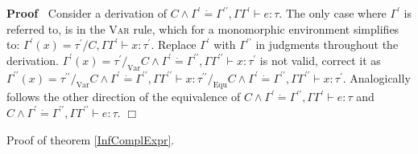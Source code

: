 \documentclass{article}
\newcommand{\tmname}[1]{\textsc{#1}}
\newcommand{\tmop}[1]{\ensuremath{\operatorname{#1}}}
\newenvironment{proof}{\noindent\textbf{Proof\ }}{\hspace*{\fill}$\Box$\medskip}
\begin{document}
\begin{proof}
  Consider a derivation of $C \wedge \Gamma^{\prime} \dot{=}
  \Gamma^{\prime\prime}, \Gamma \Gamma^{\prime} \vdash e : \tau$. The only
  case where $\Gamma^{\prime}$ is referred to, is in the {\tmname{Var}} rule,
  which for a monomorphic environment simplifies to: $\Gamma^{\prime} (x) =
  \tau^{\prime} / C, \Gamma \Gamma^{\prime} \vdash x : \tau^{\prime}$. Replace
  $\Gamma^{\prime}$ with $\Gamma^{\prime\prime}$ in judgments throughout the
  derivation. $\Gamma^{\prime} (x) = \tau^{\prime} /_{\tmop{Var}} C \wedge
  \Gamma^{\prime} \dot{=} \Gamma^{\prime\prime}, \Gamma \Gamma^{\prime\prime}
  \vdash x : \tau^{\prime}$ is not valid, correct it as $\Gamma^{\prime\prime}
  (x) = \tau^{\prime\prime} /_{\tmop{Var}} C \wedge \Gamma^{\prime} \dot{=}
  \Gamma^{\prime\prime}, \Gamma \Gamma^{\prime\prime} \vdash x :
  \tau^{\prime\prime} /_{\tmop{Equ}} C \wedge \Gamma^{\prime} \dot{=}
  \Gamma^{\prime\prime}, \Gamma \Gamma^{\prime\prime} \vdash x :
  \tau^{\prime}$. Analogically follows the other direction of the equivalence
  of $C \wedge \Gamma^{\prime} \dot{=} \Gamma^{\prime\prime}, \Gamma
  \Gamma^{\prime} \vdash e : \tau$ and $C \wedge \Gamma^{\prime} \dot{=}
  \Gamma^{\prime\prime}, \Gamma \Gamma^{\prime\prime} \vdash e : \tau$.
\end{proof}

Proof of theorem \ref{InfComplExpr}.
\end{document}
